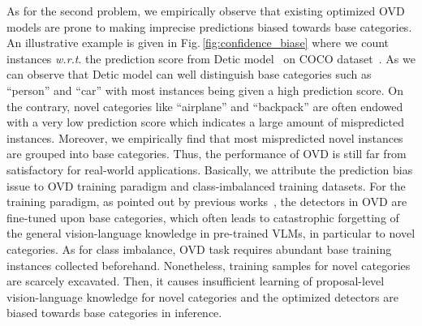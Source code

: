 \documentclass[10pt,twocolumn,letterpaper]{article}
\begin{document}
As for the second problem, we empirically observe that
existing optimized OVD models are prone to making imprecise predictions biased towards base categories. An illustrative example is given in Fig.\,\ref{fig:confidence_biase} where we count instances \emph{w.r.t}. the prediction score from Detic model~\cite{detic} on COCO dataset~\cite{coco_zeroshot}.
As we can observe that Detic model can well distinguish base categories such as ``person'' and ``car'' with most instances being given a high prediction score. On the contrary, novel categories like ``airplane'' and ``backpack'' are often endowed with a very low prediction score which indicates a large amount of mispredicted instances. Moreover, we empirically find that most mispredicted novel instances are grouped into base categories. Thus, the performance of OVD is still far from satisfactory for real-world applications.
Basically, we attribute the prediction bias issue to OVD training paradigm and class-imbalanced training datasets. 
For the training paradigm, as pointed out by previous works~\cite{ovrcnn,regionCLIP}, the detectors in OVD are fine-tuned upon base categories, which often leads to catastrophic forgetting of the general vision-language knowledge in pre-trained VLMs, in particular to novel categories.
As for class imbalance, OVD task requires abundant base training instances collected beforehand.
Nonetheless, training samples for novel categories are scarcely excavated. Then, it causes insufficient learning of proposal-level vision-language knowledge for novel categories and the optimized detectors are biased towards base categories in inference.
\end{document}
